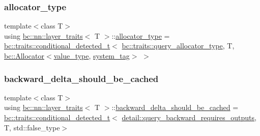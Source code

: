\subsubsection{\texorpdfstring{allocator\+\_\+type}{allocator\_type}}
{\footnotesize\ttfamily template$<$class T$>$ \\
using \hyperlink{structbc_1_1nn_1_1layer__traits}{bc\+::nn\+::layer\+\_\+traits}$<$ T $>$\+::\hyperlink{structbc_1_1nn_1_1layer__traits_afbe9ab9133f903efde7f3d307836d489}{allocator\+\_\+type} =  \hyperlink{namespacebc_1_1traits_a1a6d378947ec32acd457890854bcd592}{bc\+::traits\+::conditional\+\_\+detected\+\_\+t}$<$ \hyperlink{namespacebc_1_1traits_ab141f0cc8348b4b7ebcb48e6bbb50d09}{bc\+::traits\+::query\+\_\+allocator\+\_\+type}, T, \hyperlink{classbc_1_1allocators_1_1Allocator}{bc\+::\+Allocator}$<$\hyperlink{structbc_1_1nn_1_1layer__traits_a998c8708310306546aa5edb3ad1b46b8}{value\+\_\+type}, \hyperlink{structbc_1_1nn_1_1layer__traits_a95a88b919abd7c9ebe295a3f5171b31e}{system\+\_\+tag}$>$ $>$}

\mbox{\label{structbc_1_1nn_1_1layer__traits_a20815b34dc94e460aabd4eba8ad9baec}} 
\subsubsection{\texorpdfstring{backward\+\_\+delta\+\_\+should\+\_\+be\+\_\+cached}{backward\_delta\_should\_be\_cached}}
{\footnotesize\ttfamily template$<$class T$>$ \\
using \hyperlink{structbc_1_1nn_1_1layer__traits}{bc\+::nn\+::layer\+\_\+traits}$<$ T $>$\+::\hyperlink{structbc_1_1nn_1_1layer__traits_a20815b34dc94e460aabd4eba8ad9baec}{backward\+\_\+delta\+\_\+should\+\_\+be\+\_\+cached} =  \hyperlink{namespacebc_1_1traits_a1a6d378947ec32acd457890854bcd592}{bc\+::traits\+::conditional\+\_\+detected\+\_\+t}$<$ \hyperlink{namespacebc_1_1nn_1_1detail_ad187de638865a7fbfe0e3c1db1511e4a}{detail\+::query\+\_\+backward\+\_\+requires\+\_\+outputs}, T, std\+::false\+\_\+type$>$}

\mbox{\label{structbc_1_1nn_1_1layer__traits_adb08bd29c79f30ddfbe4cc256ff5c822}} 
